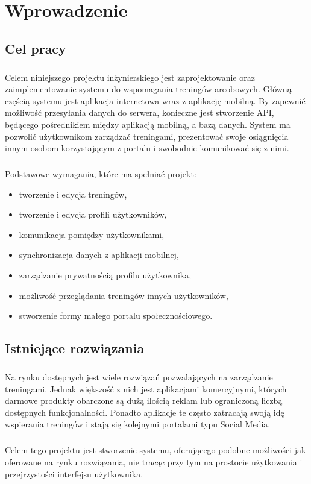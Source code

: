 \chapter{Wprowadzenie}

\section{Cel pracy}
\label{sec:cel_pracy}
\paragraph{}
Celem niniejszego projektu inżynierskiego jest zaprojektowanie oraz zaimplementowanie systemu do wspomagania treningów areobowych. Główną częścią systemu jest aplikacja internetowa wraz z aplikację mobilną. By zapewnić możliwość przesyłania danych do serwera, konieczne jest stworzenie API, będącego pośrednikiem między aplikacją mobilną, a bazą danych.
System ma pozwolić użytkownikom zarządzać treningami, prezentować swoje osiągnięcia innym osobom korzystającym z portalu i swobodnie komunikować się z nimi.
\paragraph{} %
\label{par:}
Podstawowe wymagania, które ma spełniać projekt:
\begin{itemize}
	\item tworzenie i edycja treningów,
	\item tworzenie i edycja profili użytkowników,
	\item komunikacja pomiędzy użytkownikami,
	\item synchronizacja danych z aplikacji mobilnej,
	\item zarządzanie prywatnością profilu użytkownika,
	\item możliwość przeglądania treningów innych użytkowników,
	\item stworzenie formy małego portalu społecznościowego.
\end{itemize}

\section{Istniejące rozwiązania}
\paragraph{}
Na rynku dostępnych jest wiele rozwiązań pozwalających na zarządzanie treningami. Jednak większość z nich jest aplikacjami komercyjnymi, których darmowe produkty obarczone są dużą ilością reklam lub ograniczoną liczbą dostępnych funkcjonalności. Ponadto aplikacje te często zatracają swoją idę wspierania treningów i stają się kolejnymi portalami typu Social Media. 
\paragraph{} %
\label{par:}

Celem tego projektu jest stworzenie systemu, oferującego podobne możliwości jak oferowane na rynku rozwiązania, nie tracąc przy tym na prostocie użytkowania i przejrzystości interfejsu użytkownika.
